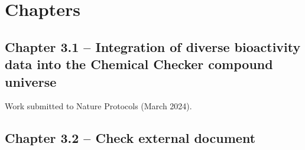 
\chapter{Chapters}
\newpage



\section[Integration of diverse bioactivity data into the Chemical Checker compound universe]{Chapter 3.1 -- Integration of diverse bioactivity data into the Chemical Checker compound universe}
\setcounter{figure}{0}
\renewcommand{\thefigure}{3.\arabic{section}.\arabic{figure}}
\hspace*{\fill} Work submitted to Nature Protocols (March 2024).






\newpage



\section[A]{Chapter 3.2 -- Check external document}
\renewcommand{\thefigure}{3.\arabic{section}.\arabic{figure}}





\newpage



